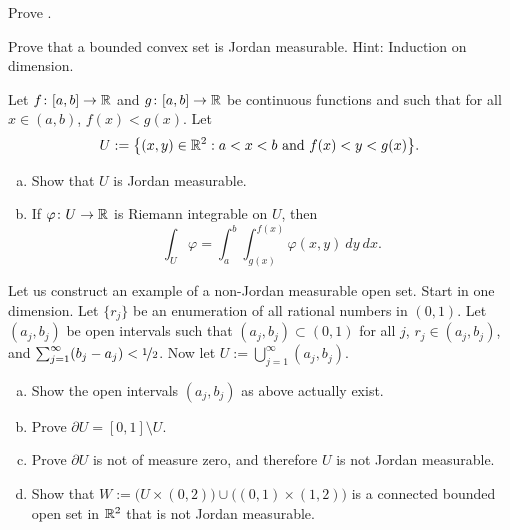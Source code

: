 \begin{exercise}
Prove .
\end{exercise}

\begin{exercise}
Prove that a bounded convex set is Jordan measurable.  Hint: Induction on
dimension.
\end{exercise}

\begin{samepage}
\begin{exercise} \label{exercise:intovertypeIset}
Let $f \colon [a,b] \to {\mathbb{R}}$ and
$g \colon [a,b] \to {\mathbb{R}}$ be continuous functions and such that
for all $x \in (a,b)$, $f(x) < g(x)$.  Let
\begin{equation*}
U := \bigl\{ (x,y) \in {\mathbb{R}}^2 : a < x < b \text{ and } f(x) < y < g(x) \bigr\} .
\end{equation*}
\begin{enumerate}[a)]
\item
Show that $U$ is Jordan measurable.
\item
If $\varphi \colon U \to {\mathbb{R}}$ is Riemann integrable on $U$, then
\begin{equation*}
\int_U \varphi =
\int_a^b \int_{g(x)}^{f(x)} \varphi(x,y) ~ dy ~ dx .
\end{equation*}
\end{enumerate}
\end{exercise}
\end{samepage}

\begin{exercise}
Let us construct an example of a non-Jordan measurable open set.
Start in one dimension.  Let $\{ r_j \}$ be an enumeration
of all rational numbers in $(0,1)$.  Let $(a_j,b_j)$ be open intervals
such that $(a_j,b_j) \subset (0,1)$ for all $j$, $r_j \in (a_j,b_j)$,
and $\sum_{j=1}^\infty (b_j-a_j) < \nicefrac{1}{2}$.  Now let $U :=
\bigcup_{j=1}^\infty (a_j,b_j)$.
\begin{enumerate}[a)]
\item
Show the open intervals $(a_j,b_j)$ as above actually exist.
\item
Prove $\partial U = [0,1] \setminus U$.
\item
Prove $\partial U$ is not of measure zero, and therefore $U$ is not Jordan measurable.
\item
Show that $W :=
\bigl( U \times (0,2) \bigr) \cup \bigl( (0,1) \times (1,2) \bigr)$
is a connected bounded open set in ${\mathbb{R}}^2$
that is not Jordan measurable.
\end{enumerate}
\end{exercise}

